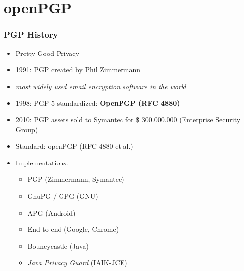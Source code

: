 \documentclass{beamer}
\begin{document}

\section{openPGP}


\begin{frame}
\frametitle{PGP History}
\begin{itemize}
	\item Pretty Good Privacy
	\item 1991: PGP created by Phil Zimmermann 
	\item \textit{most widely used email encryption software in the world}
	\item 1998: PGP 5 standardized: \textbf{OpenPGP (RFC 4880)}
	\item 2010: PGP assets sold to Symantec for \$ 300.000.000 (Enterprise Security Group)
\end{itemize}

\end{frame}

\begin{frame}


	\begin{itemize}
		\item Standard: openPGP (RFC 4880 et al.)
		\item Implementations:
		\begin{itemize}
		\item PGP (Zimmermann, Symantec)
		\item GnuPG / GPG (GNU)
		\item APG (Android)
		\item End-to-end (Google, Chrome)
		\item Bouncycastle (Java)
		\item \textit{Java Privacy Guard} (IAIK-JCE)
		\end{itemize}
	\end{itemize}

\end{frame}
\end{document}
